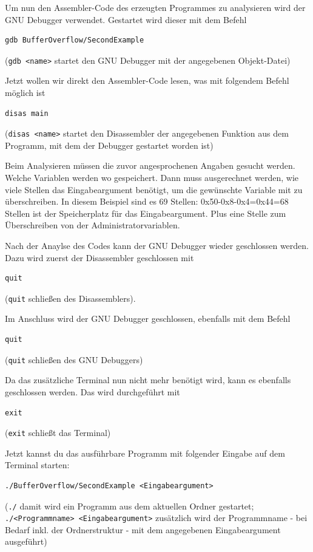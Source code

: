 Um nun den Assembler-Code des erzeugten Programmes zu analysieren wird der GNU Debugger verwendet. Gestartet wird dieser mit dem Befehl
\begin{lstlisting}
gdb BufferOverflow/SecondExample
\end{lstlisting}
(\colorbox{altgray}{\lstinline|gdb <name>|} startet den GNU Debugger mit der angegebenen Objekt-Datei)

Jetzt wollen wir direkt den Assembler-Code lesen, was mit folgendem Befehl möglich ist
\begin{lstlisting}
disas main
\end{lstlisting}
(\colorbox{altgray}{\lstinline|disas <name>|} startet den Disassembler der angegebenen Funktion aus dem Programm, mit dem der Debugger gestartet worden ist)

Beim Analysieren müssen die zuvor angesprochenen Angaben gesucht werden. Welche Variablen werden wo gespeichert. Dann muss ausgerechnet werden, wie viele Stellen das Eingabeargument benötigt, um die gewünschte Variable mit zu überschreiben. In diesem Beispiel sind es 69 Stellen: 0x50-0x8-0x4=0x44=68 Stellen ist der Speicherplatz für das Eingabeargument. Plus eine Stelle zum Überschreiben von der Administratorvariablen.

Nach der Anaylse des Codes kann der GNU Debugger wieder geschlossen werden. Dazu wird zuerst der Disassembler geschlossen mit
\begin{lstlisting}
quit
\end{lstlisting}
(\colorbox{altgray}{\lstinline|quit|} schließen des Disassemblers).

Im Anschluss wird der GNU Debugger geschlossen, ebenfalls mit dem Befehl
\begin{lstlisting}
quit
\end{lstlisting}
(\colorbox{altgray}{\lstinline|quit|} schließen des GNU Debuggers)

Da das zusätzliche Terminal nun nicht mehr benötigt wird, kann es ebenfalls geschlossen werden. Das wird durchgeführt mit
\begin{lstlisting}
exit
\end{lstlisting}
(\colorbox{altgray}{\lstinline|exit|} schließt das Terminal)

Jetzt kannst du das ausführbare Programm mit folgender Eingabe auf dem Terminal starten:
\begin{lstlisting}
./BufferOverflow/SecondExample <Eingabeargument>
\end{lstlisting}
(\colorbox{altgray}{\lstinline|./|} damit wird ein Programm aus dem aktuellen Ordner gestartet; \\
\colorbox{altgray}{\lstinline|./<Programmname> <Eingabeargument>|} zusätzlich wird der Programmname - bei Bedarf inkl. der Ordnerstruktur - mit dem angegebenen Eingabeargument ausgeführt)

